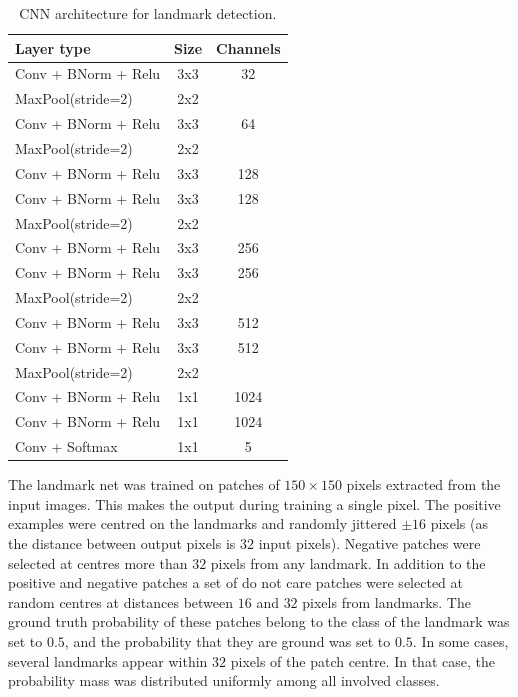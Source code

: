 \documentclass{IET}
\begin{document}
\begin{table}
\begin{center}
\begin{tabular}{|l|c|c|}
\hline
\textbf{Layer type} & \textbf{Size} & \textbf{Channels} \\
\hline

Conv + BNorm + Relu & 3x3 & 32 \\
MaxPool(stride=2) & 2x2 &  \\
\hline

Conv + BNorm + Relu & 3x3 & 64 \\
MaxPool(stride=2) & 2x2 &  \\
\hline

Conv + BNorm + Relu & 3x3 & 128 \\
Conv + BNorm + Relu & 3x3 & 128 \\
MaxPool(stride=2) & 2x2 &  \\
\hline

Conv + BNorm + Relu & 3x3 & 256 \\
Conv + BNorm + Relu & 3x3 & 256 \\
MaxPool(stride=2) & 2x2 &  \\
\hline

Conv + BNorm + Relu & 3x3 & 512 \\
Conv + BNorm + Relu & 3x3 & 512 \\
MaxPool(stride=2) & 2x2 &  \\
\hline

Conv + BNorm + Relu & 1x1 & 1024 \\
Conv + BNorm + Relu & 1x1 & 1024 \\
Conv + Softmax & 1x1 & 5 \\
\hline

\end{tabular}
\end{center}
\caption{CNN architecture for landmark detection. 
}
\label{tab:cownet}
\end{table}

The landmark net was trained on patches of $150\times 150$ pixels extracted from the input images. This makes the output during training a single pixel. The positive examples were centred on the landmarks and randomly jittered $\pm 16$ pixels (as the distance between output pixels is $32$ input pixels). Negative patches were selected at centres more than $32$ pixels from any landmark. In addition to the positive and negative patches a set of do not care patches were selected at random centres at distances between $16$ and $32$ pixels from landmarks. The ground truth probability of these patches belong to the class of the landmark was set to $0.5$, and the probability that they are ground was set to $0.5$. In some cases, several landmarks appear within $32$ pixels of the patch centre. In that case, the probability mass was distributed uniformly among all involved classes.
\end{document}
